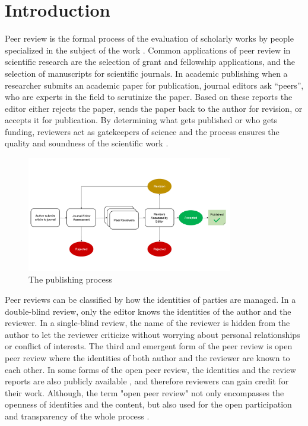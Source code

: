 
\chapter{Introduction}\label{chapter:introduction}

Peer review is the formal process of the evaluation of scholarly works by people specialized in the subject of the work \parencite[p.~864]{Moxham.2018}. Common applications of peer review in scientific research are the selection of grant and fellowship applications, and the selection of manuscripts for scientific journals. In academic publishing when a researcher submits an academic paper for publication, journal editors ask “peers”, who are experts in the field to scrutinize the paper. Based on these reports the editor either rejects the paper, sends the paper back to the author for revision, or accepts it for publication. By determining what gets published or who gets funding, reviewers act as gatekeepers of science and the process ensures the quality and soundness of the scientific work \parencite{Bornmann.2011}.

\begin{figure}[htpb]
  \centering
  \includegraphics[width=0.8\textwidth]{figures/publishing-process.png}
  \caption{The publishing process} \label{fig:publishing-process}
\end{figure}

Peer reviews can be classified by how the identities of parties are managed. In a double-blind review, only the editor knows the identities of the author and the reviewer. In a single-blind review, the name of the reviewer is hidden from the author to let the reviewer criticize without worrying about personal relationships or conflict of interests. The third and emergent form of the peer review is open peer review where the identities of both author and the reviewer are known to each other. In some forms of the open peer review, the identities and the review reports are also publicly available \parencite[4]{HorbachS.P.J.M..2017}, and therefore reviewers can gain credit for their work. Although, the term "open peer review" not only encompasses the openness of identities and the content, but also used for the open participation and transparency of the whole process \parencite{RossHellauer.2017}.

